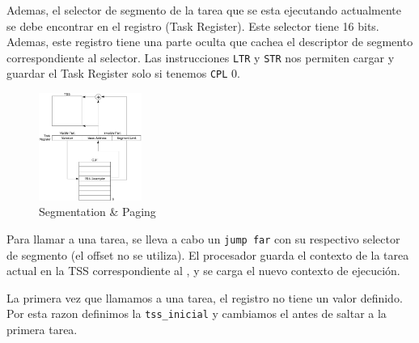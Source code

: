 Ademas, el selector de segmento de la tarea que se
esta ejecutando actualmente se debe encontrar en el registro  (Task Register). Este selector tiene 16 bits. Ademas, este registro tiene una parte oculta que cachea el descriptor de segmento correspondiente al selector. Las instrucciones \texttt{LTR} y \texttt{STR} nos permiten cargar y guardar el Task Register solo si tenemos \texttt{CPL} 0.

\begin{figure}[H]
  \centering
    \includegraphics[width=0.3\textwidth]{images/task_register}
  \caption{Segmentation \& Paging}
\end{figure}

Para llamar a una tarea, se lleva a cabo un \texttt{jump far} con su respectivo selector de segmento (el offset no se utiliza). El procesador guarda el contexto de la tarea actual en la TSS correspondiente al , y se carga el nuevo contexto de ejecución. 

La primera vez que llamamos a una tarea, el registro  no tiene un valor definido. Por esta razon definimos la \texttt{tss\_inicial} y cambiamos el  antes de saltar a la primera tarea.